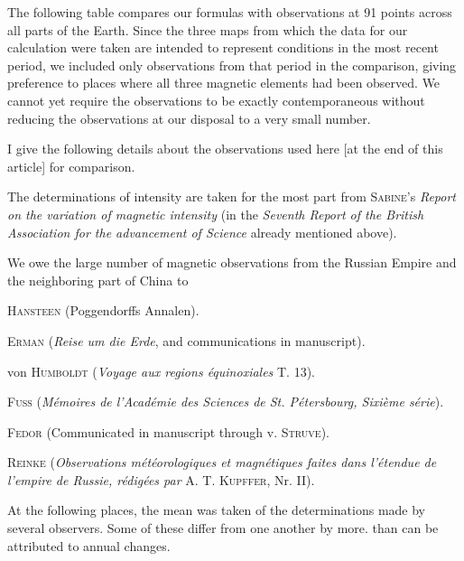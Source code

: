The following table compares our formulas with observations at 91 points across all parts of the Earth. Since the three maps from which the data for our calculation were taken are intended to represent conditions in the most recent period, we included only observations from that period in the comparison, giving preference to places where all three magnetic elements had been observed. We cannot yet require the observations to be exactly contemporaneous without reducing the observations at our disposal to a very small number.

I give the following details about the observations used here [at the end of this article] for comparison.

The determinations of intensity are taken for the most part from \textsc{Sabine}'s \textit{Report on the variation of magnetic intensity} (in the \textit{Seventh Report of the British Association for the advancement of Science} already mentioned above).

We owe the large number of magnetic observations from the Russian Empire and the neighboring part of China to

\noindent\hspace*{1em}\textsc{Hansteen} (Poggendorffs Annalen).\par
\noindent\hspace*{1em}\textsc{Erman} (\textit{Reise um die Erde}, and communications in manuscript).\par
\noindent\hspace*{1em}von \textsc{Humboldt} (\textit{Voyage aux regions équinoxiales} T. 13).\par
{}
\noindent\hspace*{1em}\textsc{Fuss} (\textit{Mémoires de l'Académie des Sciences de St. Pétersbourg, Sixième série}).\par
\noindent\hspace*{1em}\textsc{Fedor} (Communicated in manuscript through v. \textsc{Struve}).\par
\noindent\hspace*{1em}\textsc{Reinke} (\textit{Observations météorologiques et magnétiques faites dans l'étendue de l'empire de Russie, rédigées par} A. T. \textsc{Kupffer}, Nr. II).\par
At the following places, the mean was taken of the determinations made by several observers. Some of these differ from one another by more. than can be attributed to annual changes.

